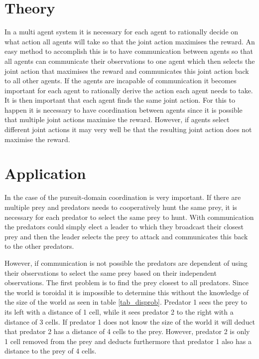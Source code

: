 \documentclass[10pt]{article}
\begin{document}
\section{Theory}\label{theory}
In a multi agent system it is necessary for each agent to rationally decide on what action all agents will take so that the joint action maximises the reward. An easy method to accomplish this is to have communication between agents so that all agents can communicate their observations to one agent which then selects the joint action that maximises the reward and communicates this joint action back to all other agents. If the agents are incapable of communication it becomes important for each agent to rationally derive the action each agent needs to take. It is then important that each agent finds the same joint action. For this to happen it is necessary to have coordination between agents\cite{Vlassis} since it is possible that multiple joint actions maximise the reward. However, if agents select different joint actions it may very well be that the resulting joint action does not maximise the reward.




\section{Application}\label{application}
In the case of the pursuit-domain coordination is very important. If there are multiple prey and predators needs to cooperatively hunt the same prey, it is necessary for each predator to select the same prey to hunt. With communication the predators could simply elect a leader to which they broadcast their closest prey and then the leader selects the prey to attack and communicates this back to the other predators.

However, if communication is not possible the predators are dependent of using their observations to select the same prey based on their independent observations. The first problem is to find the prey closest to all predators. Since the world is toroidal it is impossible to determine this without the knowledge of the size of the world as seen in table \ref{tab_disprob}. Predator 1 sees the prey to its left with a distance of 1 cell, while it sees predator 2 to the right with a distance of 3 cells. If predator 1 does not know the size of the world it will deduct that predator 2 has a distance of 4 cells to the prey. However, predator 2 is only 1 cell removed from the prey and deducts furthermore that predator 1 also has a distance to the prey of 4 cells.
\end{document}
